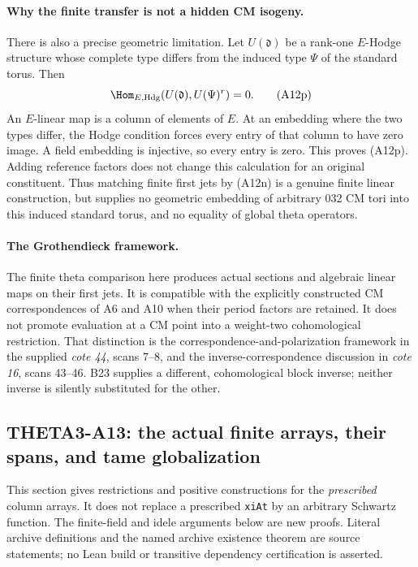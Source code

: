\documentclass[11pt]{article}
\theoremstyle{definition}\newtheorem{definition}[theorem]{Definition}\newtheorem{remark}[theorem]{Remark}
\begin{document}
\paragraph{Why the finite transfer is not a hidden CM isogeny.}
There is also a precise geometric limitation.  Let
$U(\mathfrak d)$ be a rank-one $E$-Hodge structure
whose complete type differs from the induced type
$\Psi$ of the standard torus.  Then
\[
           \Hom_{E,\mathrm{Hdg}}
                  (U(\mathfrak d),U(\Psi)^r)=0.
 \tag{A12p}
\]
An $E$-linear map is a column of elements of $E$.
At an embedding where the two types differ, the Hodge
condition forces every entry of that column to have
zero image.  A field embedding is injective, so every
entry is zero.  This proves (A12p).  Adding reference
factors does not change this calculation for an
original constituent.  Thus matching finite first
jets by (A12n) is a genuine finite linear construction,
but supplies no geometric embedding of arbitrary
032 CM tori into this induced standard torus, and
no equality of global theta operators.

\paragraph{The Grothendieck framework.}
The finite theta comparison here produces actual
sections and algebraic linear maps on their first
jets.  It is compatible with the explicitly constructed
CM correspondences of A6 and A10 when their period
factors are retained.  It does not promote evaluation
at a CM point into a weight-two cohomological restriction.
That distinction is the correspondence-and-polarization
framework in the supplied \emph{cote 44}, scans 7--8,
and the inverse-correspondence discussion in
\emph{cote 16}, scans 43--46.  B23 supplies a different,
cohomological block inverse; neither inverse is silently
substituted for the other.


\subsection{THETA3-A13: the actual finite arrays, their spans, and tame globalization}
\label{A13}

This section gives restrictions and positive constructions for the
\emph{prescribed} column arrays.  It does not replace a prescribed
\texttt{xiAt} by an arbitrary Schwartz function.  The finite-field and
idele arguments below are new proofs.  Literal archive definitions and
the named archive existence theorem are source statements; no Lean
build or transitive dependency certification is asserted.
\end{document}
